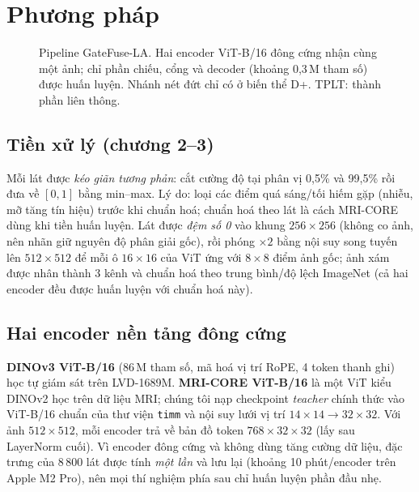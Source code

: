\documentclass[11pt,a4paper]{article}
\begin{document}
\section{Phương pháp}
\begin{figure}[t]
\centering
\resizebox{\linewidth}{!}{}
\caption{Pipeline GateFuse-LA. Hai encoder ViT-B/16 đông cứng nhận cùng một ảnh; chỉ phần chiếu, cổng và decoder (khoảng 0,3\,M tham số) được huấn luyện. Nhánh nét đứt chỉ có ở biến thể D+. TPLT: thành phần liên thông.}
\label{fig:pipeline}
\end{figure}

\subsection{Tiền xử lý (chương 2--3)}
Mỗi lát được \emph{kéo giãn tương phản}: cắt cường độ tại phân vị 0,5\% và 99,5\% rồi đưa về $[0,1]$ bằng min--max. Lý do: loại các điểm quá sáng/tối hiếm gặp (nhiễu, mỡ tăng tín hiệu) trước khi chuẩn hoá; chuẩn hoá theo lát là cách MRI-CORE dùng khi tiền huấn luyện. Lát được \emph{đệm số 0} vào khung $256\times256$ (không co ảnh, nên nhãn giữ nguyên độ phân giải gốc), rồi phóng $\times2$ bằng nội suy song tuyến lên $512\times512$ để mỗi ô $16\times16$ của ViT ứng với $8\times8$ điểm ảnh gốc; ảnh xám được nhân thành 3 kênh và chuẩn hoá theo trung bình/độ lệch ImageNet (cả hai encoder đều được huấn luyện với chuẩn hoá này).

\subsection{Hai encoder nền tảng đông cứng}
\textbf{DINOv3 ViT-B/16} \cite{dinov3} (86\,M tham số, mã hoá vị trí RoPE, 4 token thanh ghi) học tự giám sát trên LVD-1689M. \textbf{MRI-CORE ViT-B/16} \cite{mricore} là một ViT kiểu DINOv2 học trên dữ liệu MRI; chúng tôi nạp checkpoint \emph{teacher} chính thức vào ViT-B/16 chuẩn của thư viện \texttt{timm} và nội suy lưới vị trí $14\times14\to32\times32$. Với ảnh $512\times512$, mỗi encoder trả về bản đồ token $768\times32\times32$ (lấy sau LayerNorm cuối). Vì encoder đông cứng và không dùng tăng cường dữ liệu, đặc trưng của 8\,800 lát được tính \emph{một lần} và lưu lại (khoảng 10 phút/encoder trên Apple M2 Pro), nên mọi thí nghiệm phía sau chỉ huấn luyện phần đầu nhẹ.
\end{document}

